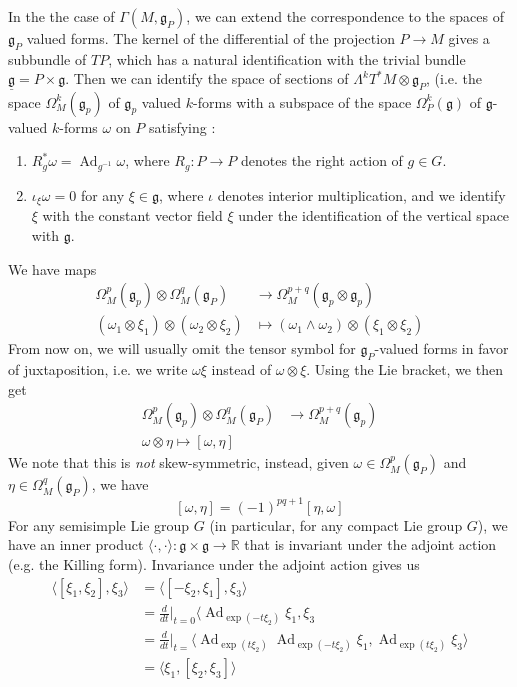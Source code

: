 \documentclass[psamsfonts, 12pt]{amsart}
\theoremstyle{definition}
\theoremstyle{remark}
\newcommand{\R}{\mathbb{R}}
\newcommand{\g}{\mathfrak{g}}
\newcommand{\inv}{^{-1}}
\DeclareMathOperator{\Ad}{Ad}
\begin{document}
In the the case of $\Gamma(M,\g_P)$, we can extend the correspondence to the spaces of
$\g_P$ valued forms. The kernel of the differential of the projection $P \to M$ gives a
subbundle of $TP$, which has a natural identification with the trivial bundle
$\underline{\g} = P \times \g$. Then we can identify the space of sections of
$\Lambda^kT^*M \otimes \g_P$, (i.e. the space $\Omega^k_M(\g_p)$ of $\g_p$ valued
$k$-forms with a subspace of the space $\Omega^k_P(\g)$ of $\g$-valued $k$-forms $\omega$
on $P$ satisfying :
\begin{enumerate}
  \item $R_g^*\omega = \Ad_{g\inv}\omega$, where $R_g : P \to P$ denotes the right
  action of $g \in G$.
  \item $\iota_\xi\omega = 0$ for any $\xi \in \g$, where $\iota$ denotes interior
  multiplication, and we identify $\xi$ with the constant vector field
  $\xi$ under the identification of the vertical space with $\g$.
\end{enumerate}
%
We have maps
\begin{align*}
\Omega^p_M(\g_p) \otimes \Omega^q_M(\g_P) &\to \Omega^{p+q}_M(\g_p \otimes \g_p) \\
(\omega_1 \otimes \xi_1) \otimes (\omega_2 \otimes \xi_2)
&\mapsto (\omega_1 \wedge \omega_2) \otimes (\xi_1 \otimes \xi_2)
\end{align*}
From now on, we will usually omit the tensor symbol for $\g_P$-valued forms in favor of
juxtaposition, i.e. we write $\omega\xi$ instead of $\omega \otimes \xi$. Using the Lie
bracket, we then get
\begin{align*}
\Omega^p_M(\g_p) \otimes \Omega^q_M(\g_P) &\to \Omega^{p+q}_M(\g_p) \\
\omega \otimes \eta \mapsto [\omega,\eta]
\end{align*}
We note that this is \emph{not} skew-symmetric, instead, given
$\omega \in \Omega^p_M(\g_P)$  and $\eta \in \Omega^q_M(\g_P)$, we have
\[
[\omega,\eta] = (-1)^{pq+1} [\eta,\omega]
\]
For any semisimple Lie group $G$ (in particular, for any compact Lie group $G$), we have
an inner product $\langle\cdot,\cdot\rangle : \g \times \g \to \R$ that is invariant
under the adjoint action (e.g. the Killing form). Invariance under the adjoint action
gives us
\begin{align*}
\langle [\xi_1,\xi_2],\xi_3 \rangle &= \langle[-\xi_2,\xi_1],\xi_3 \rangle \\
&= \frac{d}{dt}\bigg\vert_{t=0}\langle \Ad_{\exp(-t\xi_2)}\xi_1,\xi_3 \\
&= \frac{d}{dt}\bigg\vert_{t=}\langle \Ad_{\exp(t\xi_2)}\Ad_{\exp(-t\xi_2)}\xi_1,
\Ad_{\exp(t\xi_2)}\xi_3\rangle \\
&= \langle \xi_1,[\xi_2,\xi_3]\rangle
\end{align*}
\end{document}
